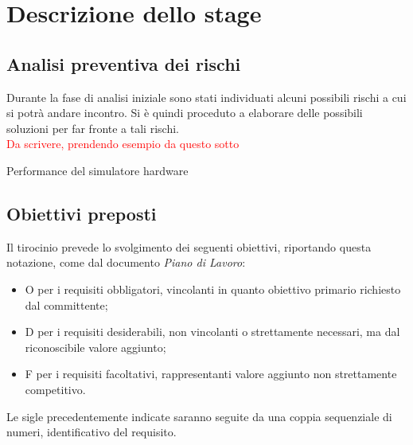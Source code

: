 \chapter{Descrizione dello stage}\label{cap:descrizione-stage}


\section{Analisi preventiva dei rischi}

Durante la fase di analisi iniziale sono stati individuati alcuni possibili rischi a cui si potrà andare incontro.
Si è quindi proceduto a elaborare delle possibili soluzioni per far fronte a tali rischi.\\

\textcolor{red}{Da scrivere, prendendo esempio da questo sotto}

\begin{risk}{Performance del simulatore hardware}
\label{risk:hardware-simulator} 
\end{risk}

\section{Obiettivi preposti}

Il tirocinio prevede lo svolgimento dei seguenti obiettivi, riportando questa notazione, come dal documento \textit{Piano di Lavoro}:
\begin{itemize}
    \item O per i requisiti obbligatori, vincolanti in quanto obiettivo primario richiesto dal committente;
    \item D per i requisiti desiderabili, non vincolanti o strettamente necessari, ma dal riconoscibile valore aggiunto;
    \item F per i requisiti facoltativi, rappresentanti valore aggiunto non strettamente competitivo.
\end{itemize}
Le sigle precedentemente indicate saranno seguite da una coppia sequenziale di numeri, identificativo del requisito.

